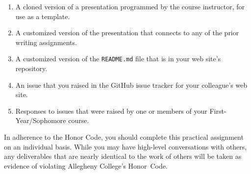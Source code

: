 \vspace*{-.1in}
\begin{enumerate}
  \setlength{\itemsep}{0in}

  \item A cloned version of a presentation programmed by the course instructor, for use as a template.
  \item A customized version of the presentation that connects to any of the prior writing assignments.
  \item A customized version of the {\tt README.md} file that is in your web site's repository.
  \item An issue that you raised in the GitHub issue tracker for your colleague's web site.
  \item Responses to issues that were raised by one or members of your First-Year/Sophomore course.

\end{enumerate}
\vspace*{-.1in}

In adherence to the Honor Code, you should complete this practical assignment on an individual basis. While you may have
high-level conversations with others, any deliverables that are nearly identical to the work of others will be taken as
evidence of violating Allegheny College's \mbox{Honor Code}.


